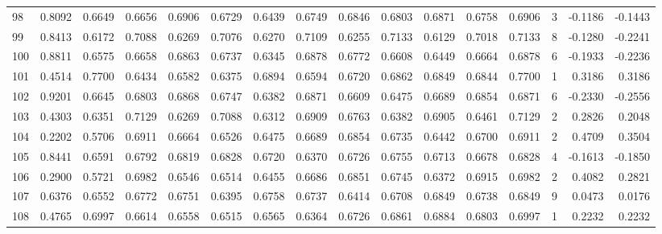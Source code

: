 \begin{tabular}{lrrrrrrrrrrrrrrr}
98  &      0.8092 &  0.6649 &  0.6656 &  0.6906 &  0.6729 &  0.6439 &  0.6749 &  0.6846 &  0.6803 &  0.6871 &   0.6758 &     0.6906 &      3 &                   -0.1186 &                    -0.1443 \\
99  &      0.8413 &  0.6172 &  0.7088 &  0.6269 &  0.7076 &  0.6270 &  0.7109 &  0.6255 &  0.7133 &  0.6129 &   0.7018 &     0.7133 &      8 &                   -0.1280 &                    -0.2241 \\
100 &      0.8811 &  0.6575 &  0.6658 &  0.6863 &  0.6737 &  0.6345 &  0.6878 &  0.6772 &  0.6608 &  0.6449 &   0.6664 &     0.6878 &      6 &                   -0.1933 &                    -0.2236 \\
101 &      0.4514 &  0.7700 &  0.6434 &  0.6582 &  0.6375 &  0.6894 &  0.6594 &  0.6720 &  0.6862 &  0.6849 &   0.6844 &     0.7700 &      1 &                    0.3186 &                     0.3186 \\
102 &      0.9201 &  0.6645 &  0.6803 &  0.6868 &  0.6747 &  0.6382 &  0.6871 &  0.6609 &  0.6475 &  0.6689 &   0.6854 &     0.6871 &      6 &                   -0.2330 &                    -0.2556 \\
103 &      0.4303 &  0.6351 &  0.7129 &  0.6269 &  0.7088 &  0.6312 &  0.6909 &  0.6763 &  0.6382 &  0.6905 &   0.6461 &     0.7129 &      2 &                    0.2826 &                     0.2048 \\
104 &      0.2202 &  0.5706 &  0.6911 &  0.6664 &  0.6526 &  0.6475 &  0.6689 &  0.6854 &  0.6735 &  0.6442 &   0.6700 &     0.6911 &      2 &                    0.4709 &                     0.3504 \\
105 &      0.8441 &  0.6591 &  0.6792 &  0.6819 &  0.6828 &  0.6720 &  0.6370 &  0.6726 &  0.6755 &  0.6713 &   0.6678 &     0.6828 &      4 &                   -0.1613 &                    -0.1850 \\
106 &      0.2900 &  0.5721 &  0.6982 &  0.6546 &  0.6514 &  0.6455 &  0.6686 &  0.6851 &  0.6745 &  0.6372 &   0.6915 &     0.6982 &      2 &                    0.4082 &                     0.2821 \\
107 &      0.6376 &  0.6552 &  0.6772 &  0.6751 &  0.6395 &  0.6758 &  0.6737 &  0.6414 &  0.6708 &  0.6849 &   0.6738 &     0.6849 &      9 &                    0.0473 &                     0.0176 \\
108 &      0.4765 &  0.6997 &  0.6614 &  0.6558 &  0.6515 &  0.6565 &  0.6364 &  0.6726 &  0.6861 &  0.6884 &   0.6803 &     0.6997 &      1 &                    0.2232 &                     0.2232 \\

\end{tabular}
